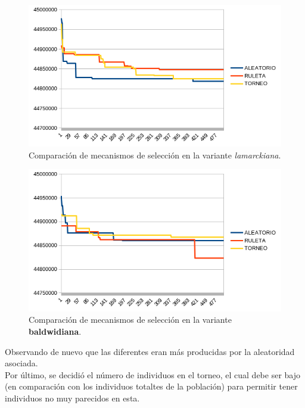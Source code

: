 	\begin{figure}[H]
	\centering
	\includegraphics[scale=0.9]{images/Lamarck/AGE-ATR.png} 
	\caption{Comparación de mecanismos de selección en la variante \textit{lamarckiana}.}
	\label{perc}
	\end{figure}
	
	\begin{figure}[H]
	\centering
	\includegraphics[scale=0.9]{images/AGE-BaldwidART.png} 
	\caption{Comparación de mecanismos de selección en la variante \textbf{baldwidiana}.}
	\label{perc}
	\end{figure}

Observando de nuevo que las diferentes eran más producidas por la aleatoridad asociada.\\

Por último, se decidió el número de individuos en el torneo, el cual debe ser bajo (en comparación con los individuos totaltes de la población) para permitir tener individuos no muy parecidos en esta. 


